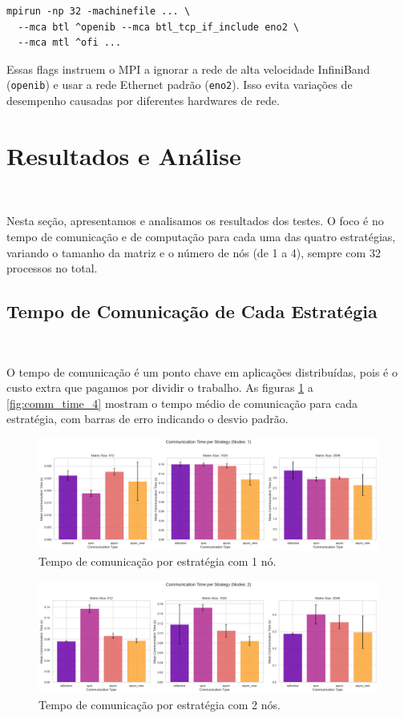 \documentclass{article}
\begin{document}
\begin{verbatim}
mpirun -np 32 -machinefile ... \
  --mca btl ^openib --mca btl_tcp_if_include eno2 \
  --mca mtl ^ofi ...
\end{verbatim}

Essas flags instruem o MPI a ignorar a rede de alta velocidade InfiniBand (\texttt{openib}) e usar a rede Ethernet padrão (\texttt{eno2}). Isso evita variações de desempenho causadas por diferentes hardwares de rede.

\section{Resultados e Análise}
\

Nesta seção, apresentamos e analisamos os resultados dos testes. O foco é no tempo de comunicação e de computação para cada uma das quatro estratégias, variando o tamanho da matriz e o número de nós (de 1 a 4), sempre com 32 processos no total.

\subsection{Tempo de Comunicação de Cada Estratégia}
\

O tempo de comunicação é um ponto chave em aplicações distribuídas, pois é o custo extra que pagamos por dividir o trabalho. As figuras \ref{fig:comm_time_1} a \ref{fig:comm_time_4} mostram o tempo médio de comunicação para cada estratégia, com barras de erro indicando o desvio padrão.

\begin{figure}[H]
    \centering
    \includegraphics[width=1\linewidth]{images/comm_time_1node.png}
    \caption{Tempo de comunicação por estratégia com 1 nó.}
    \label{fig:comm_time_1}
\end{figure}

\begin{figure}[H]
    \centering
    \includegraphics[width=1\linewidth]{images/comm_time_2nodes.png}
    \caption{Tempo de comunicação por estratégia com 2 nós.}
    \label{fig:comm_time_2}
\end{figure}
\end{document}

